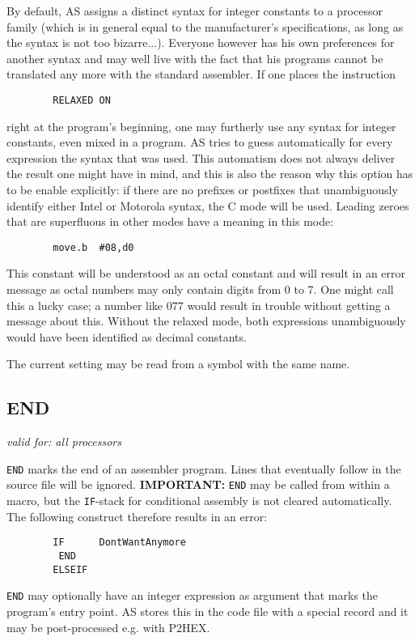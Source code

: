 \documentclass[12pt,twoside]{report}
\makeatletter
\newcommand{\bb}[1]{{\bf #1}}
\newcommand{\tty}[1]{{\tt #1}}
\newcommand{\ttindex}[1]{\index{#1@{\tt #1}}}
\makeatother
\begin{document}
By default, AS assigns a distinct syntax for integer constants to a
processor family (which is in general equal to the manufacturer's
specifications, as long as the syntax is not too bizarre...). 
Everyone however has his own preferences for another syntax and may
well live with the fact that his programs cannot be translated any
more with the standard assembler.  If one places the instruction
\begin{verbatim}
        RELAXED ON
\end{verbatim}           
right at the program's beginning, one may furtherly use any syntax
for integer constants, even mixed in a program.  AS tries to guess
automatically for every expression the syntax that was used.  This
automatism does not always deliver the result one might have in mind,
and this is also the reason why this option has to be enable
explicitly: if there are no prefixes or postfixes that unambiguously 
identify either Intel or Motorola syntax, the C mode will be used. 
Leading zeroes that are superfluous in other modes have a meaning in
this mode:
\begin{verbatim}
        move.b  #08,d0
\end{verbatim}
This constant will be understood as an octal constant and will result
in an error message as octal numbers may only contain digits from 0
to 7.  One might call this a lucky case; a number like 077 would
result in trouble without getting a message about this.  Without the
relaxed mode, both expressions unambiguously would have been
identified as decimal constants.

The current setting may be read from a symbol with the same name.


\subsection{END}
\ttindex{END}
           
{\em valid for: all processors}

\tty{END} marks the end of an assembler program.  Lines that eventually
follow in the source file will be ignored.  \bb{IMPORTANT:} \tty{END} may
be called from within a macro, but the \tty{IF}-stack for conditional
assembly is not cleared automatically.  The following construct therefore
results in an error:
\begin{verbatim}
        IF      DontWantAnymore
         END
        ELSEIF
\end{verbatim}
\tty{END} may optionally have an integer expression as argument that marks
the program's entry point.  AS stores this in the code file with a special
record and it may be post-processed e.g. with P2HEX.
\end{document}
